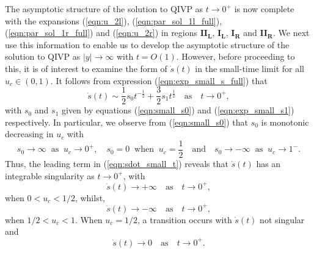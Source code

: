 \documentclass[11pt,a4paper]{article}
\newcommand{\eeref}[1]{(\ref{eqn:#1})}
\newcommand{\eelab}[1]{\label{eqn:#1}}
\def\beq{\begin{equation}}
\def\eeq{\end{equation}}
\begin{document}
The asymptotic structure of the solution to QIVP as $t \to 0^+$ is now complete with the expansions 
 \eeref{u_2l},
\eeref{par_sol_1l_full},
\eeref{par_sol_1r_full}
and
 \eeref{u_2r} 
in regions $\mathbf{II_L}$, $\mathbf{I_L}$, $\mathbf{I_R}$ and $\mathbf{II_R}$.  
%
 We next use this information to enable us to develop the asymptotic structure of the solution to QIVP as $\lvert y \rvert \to \infty$ with $t=O(1)$. However, before proceeding to this, it is of interest to examine the form of $\dot{s}(t)$ in the small-time limit for all $u_c \in (0,1)$.
It follows from  expression \eeref{exp_small_s_full} that
\beq  \eelab{sdot_small_t}
\dot{s}(t) \sim \frac{1}{2}s_0 t^{- \frac{1}{2}} + \frac{3}{2}s_1 t^{\frac{1}{2}} \quad \mbox{as} \quad t \to 0^+,
\eeq
with $s_0$ and $s_1$ given by equations \eeref{small_s0} and \eeref{exp_small_s1} respectively. 
In particular, we observe from \eeref{small_s0} that $s_0$ is monotonic decreasing in $u_c$ with 
\beq \eelab{s0_limits}
s_0 \to \infty \; \; \mbox{as} \; \; u_c \to 0^+, \quad s_0=0 \; \; \mbox{when} \; \; u_c=\frac{1}{2} \quad \mbox{and} \quad s_0 \to - \infty \; \; \mbox{as} \; \; u_c \to 1^-.
\eeq
Thus, the leading term in \eeref{sdot_small_t} reveals that $\dot{s}(t)$ has an integrable singularity as $t \to 0^+$, with 
\beq \eelab{sdot_small1}
\dot{s}(t) \to + \infty \quad \mbox{as} \quad t \to 0^+,
\eeq
when $0 < u_c < 1/2$, whilst, 
\beq \eelab{sdot_small2}
\dot{s}(t) \to - \infty \quad \mbox{as} \quad t \to 0^+,
\eeq
when $1/2 < u_c < 1$. When $u_c=1/2$,   a transition  occurs with $\dot s(t)$ not   
singular and 
\beq \eelab{sdot_small3}
\dot{s}(t) \to 0  \quad \mbox{as} \quad t \to 0^+. 
\eeq
\end{document}
